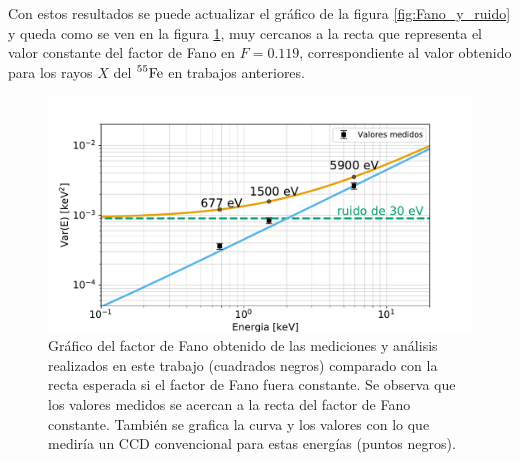 Con estos resultados se puede actualizar el gráfico de la figura \ref{fig:Fano_y_ruido} y queda como se ven en la figura \ref{fig:Fano_y_ruido_final}, muy cercanos a la recta que representa el valor constante del factor de Fano en $F = 0.119$, correspondiente al valor obtenido para los rayos $X$ del $\prescript{55}{}{\mbox{Fe}}$ en trabajos anteriores\cite{Rodrigues}.
\begin{figure}[H]
    \centering
        \includegraphics[scale=0.5]{Figs/FanoyRuidoFinal.pdf}
    \caption{Gráfico del factor de Fano obtenido de las mediciones y análisis realizados en este trabajo (cuadrados negros) comparado con la recta esperada si el factor de Fano fuera constante. Se observa que los valores medidos se acercan a la recta del factor de Fano constante. También se grafica la curva y los valores con lo que mediría un CCD convencional para estas energías (puntos negros).}
    \label{fig:Fano_y_ruido_final}
\end{figure}